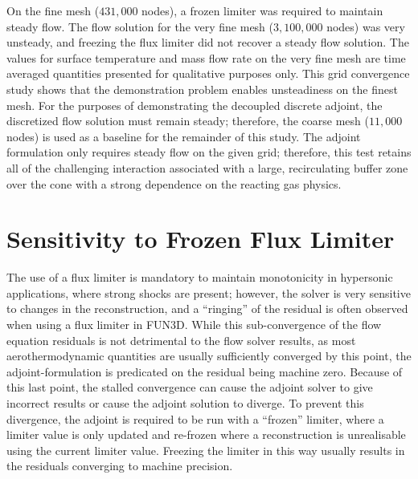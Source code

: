 On the fine mesh ($431,000$ nodes), a frozen limiter was required to maintain
steady flow.  The flow solution for the very fine mesh ($3,100,000$ nodes) was
very unsteady, and freezing the flux limiter did not recover a steady flow
solution.  The values for surface temperature and mass flow rate on the very
fine mesh are time averaged quantities presented for qualitative purposes only.
This grid convergence study shows that the demonstration problem enables
unsteadiness on the finest mesh.  For the purposes of demonstrating the
decoupled discrete adjoint, the discretized flow solution must remain steady;
therefore, the coarse mesh ($11,000$ nodes) is used as a baseline for the
remainder of this study.  The adjoint formulation only requires steady flow on
the given grid; therefore, this test retains all of the challenging interaction
associated with a large, recirculating buffer zone over the cone with a strong
dependence on the reacting gas physics.

\section{Sensitivity to Frozen Flux Limiter}
\label{sec:frozen-limiter}

The use of a flux limiter is mandatory to maintain monotonicity in hypersonic
applications, where strong shocks are present; however, the solver is very
sensitive to changes in the reconstruction, and a ``ringing'' of the residual is
often observed\cite{gnoffo2007ringing} when using a flux limiter in FUN3D. While
this sub-convergence of the flow equation residuals is not detrimental to the
flow solver results, as most aerothermodynamic quantities are usually
sufficiently converged by this point, the adjoint-formulation is predicated on
the residual being machine zero.  Because of this last point, the stalled
convergence can cause the adjoint solver to give incorrect results or cause the
adjoint solution to diverge.  To prevent this divergence, the adjoint is
required to be run with a ``frozen'' limiter, where a limiter value is only
updated and re-frozen where a reconstruction is unrealisable using the current
limiter value.  Freezing the limiter in this way usually results in the
residuals converging to machine precision.

